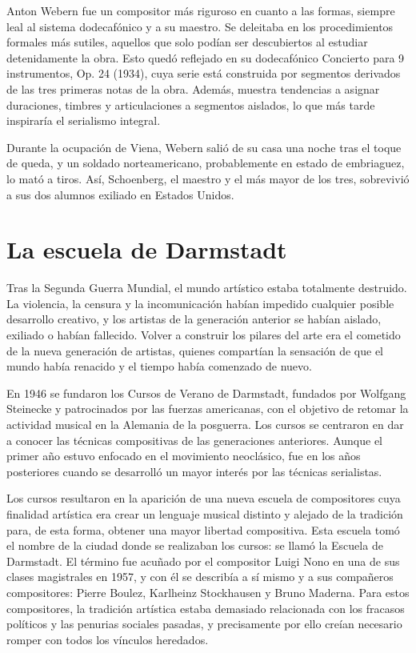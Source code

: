 	Anton Webern fue un compositor más riguroso en cuanto a las formas, siempre leal al sistema dodecafónico y a su maestro. Se deleitaba en los procedimientos formales más sutiles, aquellos que solo podían ser descubiertos al estudiar detenidamente la obra. Esto quedó reflejado en su dodecafónico Concierto para 9 instrumentos, Op. 24 (1934), cuya serie está construida por segmentos derivados de las tres primeras notas de la obra. Además, muestra tendencias a asignar duraciones, timbres y articulaciones a segmentos aislados, lo que más tarde inspiraría el serialismo integral.
        
	Durante la ocupación de Viena, Webern salió de su casa una noche tras el toque de queda, y un soldado norteamericano, probablemente en estado de embriaguez, lo mató a tiros. Así, Schoenberg, el maestro y el más mayor de los tres, sobrevivió a sus dos alumnos exiliado en Estados Unidos.
    
	\section{La escuela de Darmstadt}
	Tras la Segunda Guerra Mundial, el mundo artístico estaba totalmente destruido. La violencia, la censura y la incomunicación habían impedido cualquier posible desarrollo creativo, y los artistas de la generación anterior se habían aislado, exiliado o habían fallecido. Volver a construir los pilares del arte era el cometido de la nueva generación de artistas, quienes compartían la sensación de que el mundo había renacido y el tiempo había comenzado de nuevo.
	
	En 1946 se fundaron los Cursos de Verano de Darmstadt, fundados por Wolfgang Steinecke y patrocinados por las fuerzas americanas, con el objetivo de retomar la actividad musical en la Alemania de la posguerra. Los cursos se centraron en dar a conocer las técnicas compositivas de las generaciones anteriores. Aunque el primer año estuvo enfocado en el movimiento neoclásico, fue en los años posteriores cuando se desarrolló un mayor interés por las técnicas serialistas.
	
	Los cursos resultaron en la aparición de una nueva escuela de compositores cuya finalidad artística era crear un lenguaje musical distinto y alejado de la tradición para, de esta forma, obtener una mayor libertad compositiva. Esta escuela tomó el nombre de la ciudad donde se realizaban los cursos: se llamó la Escuela de Darmstadt. El término fue acuñado por el compositor Luigi Nono en una de sus clases magistrales en 1957, y con él se describía a sí mismo y a sus compañeros compositores: Pierre Boulez, Karlheinz Stockhausen y Bruno Maderna. Para estos compositores, la tradición artística estaba demasiado relacionada con los fracasos políticos y las penurias sociales pasadas, y precisamente por ello creían necesario romper con todos los vínculos heredados.
	
